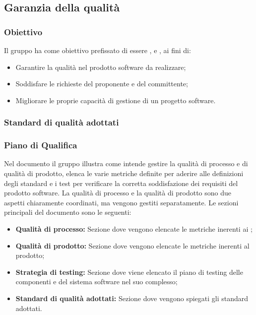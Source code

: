 \subsection{Garanzia della qualità}
\subsubsection{Obiettivo}
Il gruppo \Gruppo{} ha come obiettivo prefissato di essere ,  e , ai fini di:
\begin{itemize}
    \item Garantire la qualità nel prodotto software da realizzare;
    \item Soddisfare le richieste del proponente e del committente;
    \item Migliorare le proprie capacità di gestione di un progetto software.
\end{itemize}

\subsubsection{Standard di qualità adottati}



\subsubsection{Piano di Qualifica}
Nel documento \PdQ{} il gruppo \Gruppo{} illustra come intende gestire la qualità di processo e di qualità di prodotto, elenca le varie metriche definite per aderire alle definizioni degli standard e i test per verificare la corretta soddisfazione dei requisiti del prodotto software.\newline
La qualità di processo e la qualità di prodotto sono due aspetti chiaramente coordinati, ma vengono gestiti separatamente.
Le sezioni principali del documento sono le seguenti:
\begin{itemize}
    \item \textbf{Qualità di processo:} Sezione dove vengono elencate le metriche inerenti ai ;
    \item \textbf{Qualità di prodotto:} Sezione dove vengono elencate le metriche inerenti al prodotto;
    \item \textbf{Strategia di testing:} Sezione dove viene elencato il piano di testing delle componenti e del sistema software nel suo complesso;
    \item \textbf{Standard di qualità adottati:} Sezione dove vengono spiegati gli standard adottati.
\end{itemize}

